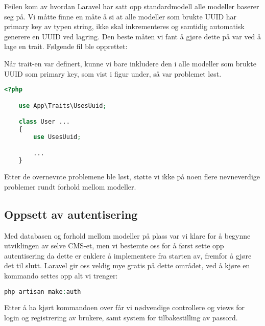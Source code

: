 Feilen kom av hvordan Laravel har satt opp standardmodell alle modeller baserer seg på.
Vi måtte finne en måte å si at alle modeller som brukte UUID har primary key av typen string, ikke skal inkrementeres og samtidig automatisk generere en UUID ved lagring. Den beste måten vi fant å gjøre dette på var ved å lage en trait. Følgende fil ble opprettet:


Når trait-en var definert, kunne vi bare inkludere den i alle modeller som brukte UUID som primary key, som vist i figur under, så var problemet løst.
\begin{lstlisting}[caption={Bruk av UUID trait i modell}, language=PHP]
    <?php

    use App\Traits\UsesUuid;

    class User ...
    {
        use UsesUuid;

        ...
    }
\end{lstlisting}

Etter de overnevnte problemene ble løst, støtte vi ikke på noen flere nevneverdige problemer rundt forhold mellom modeller.

\subsection{Oppsett av autentisering}
Med databasen og forhold mellom modeller på plass var vi klare for å begynne utviklingen av selve CMS-et, men vi bestemte oss for å først sette opp autentisering da dette er enklere å implementere fra starten av, fremfor å gjøre det til slutt.
Laravel gir oss veldig mye gratis på dette området, ved å kjøre en kommando settes opp alt vi trenger:
\begin{lstlisting}[language=PHP]
    php artisan make:auth
\end{lstlisting}
Etter å ha kjørt kommandoen over får vi nødvendige controllere og views for login og registrering av brukere, samt system for tilbakestilling av passord.





